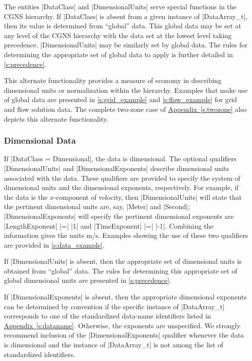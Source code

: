 The entities |DataClass| and |DimensionalUnits| serve special functions in
the CGNS hierarchy.  If |DataClass| is absent from a given instance of
|DataArray_t|, then its value is determined from ``global'' data.  This global
data may be set at any level of the CGNS hierarchy with the data set at the
lowest level taking precedence.  |DimensionalUnits| may be similarly set by
global data.  The rules for determining the appropriate set of global data to
apply is further detailed in \autoref{s:precedence}.

This alternate functionality provides a measure of economy in describing
dimensional units or normalization within the hierarchy.  Examples that
make use of global data are presented in \autoref{s:grid_example} and
\autoref{s:flow_example} for grid and flow solution data.  The complete
two-zone case of \hyperref[s:twozone]{Appendix~\ref*{s:twozone}} also
depicts this alternate functionality.

\subsubsection{Dimensional Data}
\label{s:data_dim}

If |DataClass = Dimensional|, the data is dimensional.
The optional qualifiers |DimensionalUnits| and |DimensionalExponents|
describe dimensional units associated with the data.
These qualifiers are provided to specify the system of dimensional units
and the dimensional exponents, respectively.
For example, if the data is the $x$-component of velocity, then
|DimensionalUnits| will state that the pertinent dimensional units are,
say, |Meter| and |Second|; |DimensionalExponents| will specify the
pertinent dimensional exponents are |LengthExponent| |=| |1| and
|TimeExponent| |=| |-1|.
Combining the information gives the units m/s.
Examples showing the use of these two qualifiers are provided in
\autoref{s:data_example}.

If |DimensionalUnits| is absent, then the appropriate set of dimensional
units is obtained from ``global'' data.  The rules for determining
this appropriate set of global dimensional units are presented in
\autoref{s:precedence}.

If |DimensionalExponents| is absent, then the appropriate dimensional
exponents can be determined by convention if the specific instance of
|DataArray_t| corresponds to one of the standardized data-name identifiers
listed in \hyperref[s:dataname]{Appendix~\ref*{s:dataname}}.
Otherwise, the exponents are unspecified.
We strongly recommend inclusion of the |DimensionalExponents| qualifier
whenever the data is dimensional and the instance of |DataArray_t| is not
among the list of standardized identifiers.

